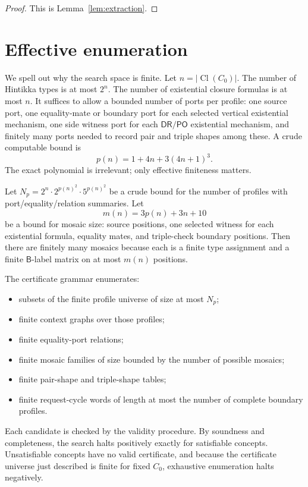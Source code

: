 \documentclass[11pt]{article}
\newcommand{\Cl}{\operatorname{Cl}}
\newcommand{\Base}{\mathsf B}
\newcommand{\PO}{\mathsf{PO}}
\newcommand{\DR}{\mathsf{DR}}
\begin{document}
\begin{proof}
This is Lemma~\ref{lem:extraction}.
\end{proof}

\section{Effective enumeration}

We spell out why the search space is finite.  Let \(n=|\Cl(C_0)|\).  The number of Hintikka types is at most \(2^n\).  The number of existential closure formulas is at most \(n\).  It suffices to allow a bounded number of ports per profile: one source port, one equality-mate or boundary port for each selected vertical existential mechanism, one side witness port for each \(\DR/\PO\) existential mechanism, and finitely many ports needed to record pair and triple shapes among these.  A crude computable bound is
\[
  p(n)=1+4n+3(4n+1)^3.
\]
The exact polynomial is irrelevant; only effective finiteness matters.

Let \(N_p=2^n\cdot 2^{p(n)^2}\cdot 5^{p(n)^2}\) be a crude bound for the number of profiles with port/equality/relation summaries.  Let
\[
  m(n)=3p(n)+3n+10
\]
be a bound for mosaic size: source positions, one selected witness for each existential formula, equality mates, and triple-check boundary positions.  Then there are finitely many mosaics because each is a finite type assignment and a finite \(\Base\)-label matrix on at most \(m(n)\) positions.

The certificate grammar enumerates:
\begin{itemize}
\item subsets of the finite profile universe of size at most \(N_p\);
\item finite context graphs over those profiles;
\item finite equality-port relations;
\item finite mosaic families of size bounded by the number of possible mosaics;
\item finite pair-shape and triple-shape tables;
\item finite request-cycle words of length at most the number of complete boundary profiles.
\end{itemize}
Each candidate is checked by the validity procedure.  By soundness and completeness, the search halts positively exactly for satisfiable concepts.  Unsatisfiable concepts have no valid certificate, and because the certificate universe just described is finite for fixed \(C_0\), exhaustive enumeration halts negatively.
\end{document}
